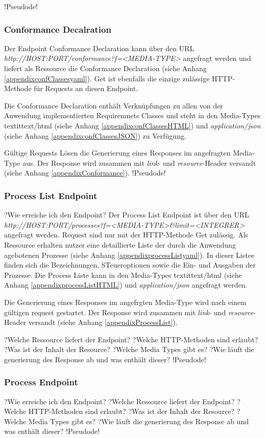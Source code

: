!Pseudode!
\subsubsection{Conformance Decalration}
Der Endpoint Conformance Declaration kann über den URL \textit{http://HOST:PORT/conformance?f=<MEDIA-TYPE>} angefragt werden und liefert als Ressource die Conformance Declaration (siehe Anhang \ref{appendixconfClassesyaml}).
Get ist ebenfalls die einzige zulässige HTTP-Methode für Requests an diesen Endpoint.

Die Conformance Declaration enthält Verknüpfungen zu allen von der Anwendung implementierten Requiremnets Classes und steht in den Media-Types textit{text/html} (siehe Anhang \ref{appendixconfClassesHTML}) und 
\textit{application/json} (siehe Anhang \ref{appendixconfClassesJSON}) zu Verfügung.

Gültige Requests Lösen die Generierung eines Responses im angefragten Media-Type aus. Der Response wird zusammen mit \textit{link}- und \textit{resource}-Header versandt (siehe Anhang \ref{appendixConformance}).
!Pseudode!

\subsubsection{Process List Endpoint}
?Wie erreiche ich den Endpoint?
Der Process List Endpoint ist über den URL \textit{http://HOST:PORT/processes?f=<MEDIA-TYPE>&limit=<INTEGRER>} angefragt werden. 
Request sind nur mit der HTTP-Methode Get zulässig. Als Ressource erhalten nutzer eine detaillierte Liste der durch die Anwendung agebotenen Prozesse (siehe Anhang \ref{appendixprocessListyaml}). In dieser Listee finden sich die Bezeichnungen, STeueroptionen sowie die 
Ein- und Ausgaben der Prozesse. Die Process Liste kann in den Media-Types textit{text/html} (siehe Anhang \ref{appendixprocessListHTML}) und \textit{application/json} angefragt werden. 

Die Generierung eines Responses im angefrgten Media-Type wird nach einem gültigen request gestartet. Der Response wird zusammen mit \textit{link}- und \textit{resource}-Header versandt (siehe Anhang \ref{appendixProcessList}).

?Welche Ressource liefert der Endpoint?
?Welche HTTP-Methoden sind erlaubt?
?Was ist der Inhalt der Resource?
?Welche Media Types gibt es?
?Wie läuft die generierung des Response ab und was enthält dieser?
!Pseudode!
\subsubsection{Process Endpoint}?Wie erreiche ich den Endpoint?
?Welche Ressource liefert der Endpoint?
?Welche HTTP-Methoden sind erlaubt?
?Was ist der Inhalt der Resource?
?Welche Media Types gibt es?
?Wie läuft die generierung des Response ab und was enthält dieser?
!Pseudode!
